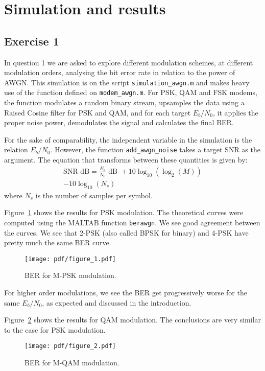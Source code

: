 \section{Simulation and results}

\subsection{Exercise 1}

In question 1 we are asked to explore different modulation schemes, at different
modulation orders, analysing the bit error rate in relation to the power of
AWGN\@. This simulation is on the script {\tt simulation\_awgn.m} and makes heavy
use of the function defined on {\tt modem\_awgn.m}. For PSK, QAM and FSK modems,
the function modulates a random binary stream, upsamples the data using a Raised
Cosine filter for PSK and QAM, and for each target \(E_b/N_0\), it applies the
proper noise power, demodulates the signal and calculates the final BER\@.

For the sake of comparability, the independent variable in the simulation is the
relation \(E_b/N_0\). However, the function {\tt add\_awgn\_noise} takes a target
SNR as the argument. The equation that transforms between these quantities is
given by:
\begin{multline}
    \text{SNR dB} = \frac{E_b}{N_0} \text{ dB }
    + 10 \log_{10} \left( \log_2 (M) \right) \\
    - 10 \log_{10} (N_s)
\end{multline}
where \(N_s\) is the number of samples per symbol.

Figure~\ref{fig:pskberawgnres} shows the results for PSK modulation. The
theoretical curves were computed using the MALTAB function {\tt berawgn}. We see
good agreement between the curves. We see that 2-PSK (also called BPSK for binary)
and 4-PSK have pretty much the same BER curve.
\begin{figure}
    \centering
    \texttt{[image: pdf/figure\_1.pdf]}
    \caption{BER for M-PSK modulation.\label{fig:pskberawgnres}}
\end{figure}
For higher order modulations, we see the BER get progressively worse for the same
\(E_b/N_0\), as expected and discussed in the introduction.

Figure~\ref{fig:qamberawgnres} shows the results for QAM modulation. The
conclusions are very similar to the case for PSK modulation.
\begin{figure}
    \centering
    \texttt{[image: pdf/figure\_2.pdf]}
    \caption{BER for M-QAM modulation.\label{fig:qamberawgnres}}
\end{figure}


